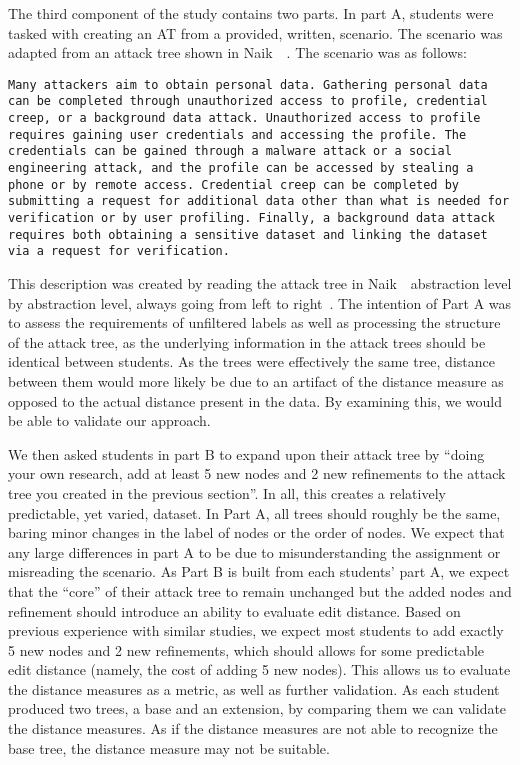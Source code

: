 The third component of the study contains two parts. In part A, students were tasked with creating an AT from a provided, written, scenario. The scenario was adapted from an attack tree shown in Naik~\etal~\cite{naikEvaluationPotentialAttack2022}. The scenario was as follows:

\texttt{Many attackers aim to obtain personal data. Gathering personal data can be completed through unauthorized access to profile, credential creep, or a background data attack. Unauthorized access to profile requires gaining user credentials and accessing the profile. The credentials can be gained through a malware attack or a social engineering attack, and the profile can be accessed by stealing a phone or by remote access. Credential creep can be completed by submitting a request for additional data other than what is needed for verification or by user profiling. Finally, a background data attack requires both obtaining a sensitive dataset and linking the dataset via a request for verification.}

This description was created by reading the attack tree in Naik~\etal\ abstraction level by abstraction level, always going from left to right~\cite{naikEvaluationPotentialAttack2022}. The intention of Part A was to assess the requirements of unfiltered labels as well as processing the structure of the attack tree, as the underlying information in the attack trees should be identical between students. As the trees were effectively the same tree, distance between them would more likely be due to an artifact of the distance measure as opposed to the actual distance present in the data. By examining this, we would be able to validate our approach.

We then asked students in part B to expand upon their attack tree by ``doing your own research, add at least 5 new nodes and 2 new refinements to the attack tree you created in the previous section''. In all, this creates a relatively predictable, yet varied, dataset. In Part A, all trees should roughly be the same, baring minor changes in the label of nodes or the order of nodes. We expect that any large differences in part A to be due to misunderstanding the assignment or misreading the scenario. As Part B is built from each students' part A, we expect that the ``core'' of their attack tree to remain unchanged but the added nodes and refinement should introduce an ability to evaluate edit distance. Based on previous experience with similar studies, we expect most students to add exactly 5 new nodes and 2 new refinements, which should allows for some predictable edit distance (namely, the cost of adding 5 new nodes). This allows us to evaluate the distance measures as a metric, as well as further validation. As each student produced two trees, a base and an extension, by comparing them we can validate the distance measures. As if the distance measures are not able to recognize the base tree, the distance measure may not be suitable.

